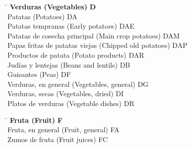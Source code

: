 \begin{small}
    \vspace{-1.25cm}
    
    \begin{tabbing}
    \hspace{15cm} \= \hspace{0cm} \kill
        \textbf{Verduras (Vegetables)} \> \textbf{D} \\
            \hspace{0.5cm}Patatas (Potatoes) \> DA \\
                \hspace{1cm}Patatas tempranas (Early potatoes) \> DAE \\
                \hspace{1cm}Patatas de cosecha principal (Main crop potatoes) \> DAM \\
                \hspace{1cm}Papas fritas de patatas viejas (Chipped old potatoes) \> DAP \\
                \hspace{1cm}Productos de patata (Potato products) \> DAR \\
            \hspace{0.5cm}Judías y lentejas (Beans and lentils) \> DB \\
            \hspace{0.5cm}Guisantes (Peas) \> DF \\
            \hspace{0.5cm}Verduras, en general (Vegetables, general) \> DG \\
            \hspace{0.5cm}Verduras, secas (Vegetables, dried) \> DI \\
            \hspace{0.5cm}Platos de verduras (Vegetable dishes) \> DR \\
    \end{tabbing}
    
    \vspace{-1.25cm}

    \begin{tabbing}
    \hspace{15cm} \= \hspace{0cm} \kill
        \textbf{Fruta (Fruit)} \> \textbf{F} \\
            \hspace{0.5cm}Fruta, en general (Fruit, general) \> FA \\
            \hspace{0.5cm}Zumos de fruta (Fruit juices) \> FC \\
    \end{tabbing}


\end{small}

